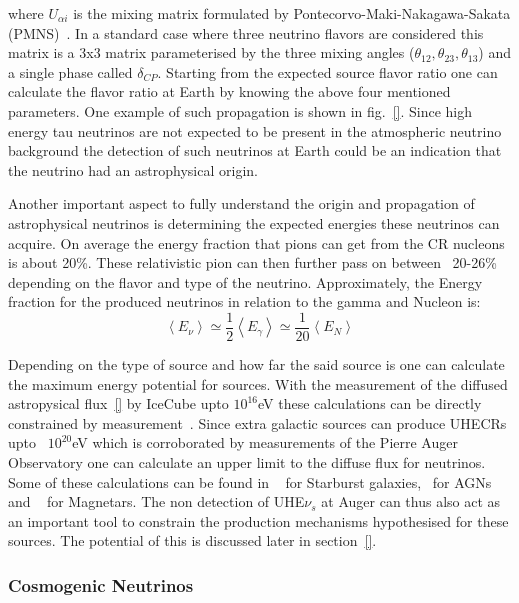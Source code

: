 where $U_{\alpha i}$ is the mixing matrix formulated by Pontecorvo-Maki-Nakagawa-Sakata (PMNS)~\cite{}. In a standard case where three neutrino flavors are considered this matrix is a 3x3 matrix parameterised by the three mixing angles ($\theta_{12},\theta_{23},\theta_{13}$) and a single phase called $\delta_{CP}$. Starting from the expected source flavor ratio one can calculate the flavor ratio at Earth by knowing the above four mentioned parameters. One example of such propagation is shown in fig.~\ref{}. Since high energy tau neutrinos are not expected to be present in the atmospheric neutrino background the detection of such neutrinos at Earth could be an indication that the neutrino had an astrophysical origin. 

Another important aspect to fully understand the origin and propagation of astrophysical neutrinos is determining the expected energies these neutrinos can acquire. On average the energy fraction that pions can get from the CR nucleons is about 20\%. These relativistic pion can then further pass on between ~20-26\% depending on the flavor and type of the neutrino. Approximately, the Energy fraction for the produced neutrinos in relation to the gamma and Nucleon is:
\begin{equation}
  \left\langle E_{\nu} \right\rangle  \simeq  \frac{1}{2}\left\langle E_{\gamma} \right\rangle \simeq  \frac{1}{20}\left\langle E_{N} \right\rangle
  \end{equation}

Depending on the type of source and how far the said source is one can calculate the maximum energy potential for sources. With the measurement of the diffused astropysical flux~\ref{} by IceCube upto $10^{16}$eV these calculations can be directly constrained by measurement~\cite{}. Since extra galactic sources can produce UHECRs upto ~$10^{20}$eV which is corroborated by measurements of the Pierre Auger Observatory one can calculate an upper limit to the diffuse flux for neutrinos. Some of these calculations can be found in ~\cite{} for Starburst galaxies, ~\cite{}for AGNs and ~\cite{} for Magnetars. The non detection of UHE$\nu_s$ at Auger can thus also act as an important tool to constrain the production mechanisms hypothesised for these sources. The potential of this is discussed later in section~\ref{}.   

\subsubsection*{Cosmogenic Neutrinos}
\label{subsubsec:CosmoNu}

